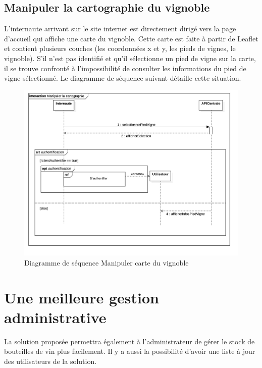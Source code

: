 \documentclass[a4paper, titlepage]{report}
\begin{document}
\subsection{Manipuler la cartographie du vignoble}\label{manipuler-la-cartographie-du-vignoble}

L'internaute arrivant sur le site internet est directement dirigé vers
la page d'accueil qui affiche une carte du vignoble. Cette carte est
faite à partir de Leaflet et contient plusieurs couches (les coordonnées
x et y, les pieds de vignes, le vignoble). S'il n'est pas identifié et
qu'il sélectionne un pied de vigne sur la carte, il se trouve confronté
à l'impossibilité de consulter les informations du pied de vigne
sélectionné. Le diagramme de séquence suivant détaille cette situation.

\clearpage
\begin{figure}[!h]
\centering
\includegraphics{Images/SequenceDiagramManipulerCarte.jpg}
\caption{Diagramme de séquence Manipuler carte du vignoble}
\end{figure}

\section{Une meilleure gestion administrative}\label{une-meilleure-gestion-administrative}

La solution proposée permettra également à l'administrateur de gérer le
stock de bouteilles de vin plus facilement. Il y a aussi la possibilité
d'avoir une liste à jour des utilisateurs de la solution.
\end{document}
